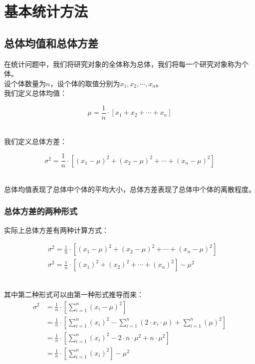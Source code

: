 \documentclass[UTF8]{ctexart}
\begin{document}
\newpage

\section{基本统计方法}

\subsection{总体均值和总体方差}
    在统计问题中，我们将研究对象的全体称为总体，我们将每一个研究对象称为个体。\\[3mm]
    设个体数量为$n$，设个体的取值分别为$x_1,x_2,\cdots,x_n$。\\[3mm]
    我们定义总体均值：
    \begin{large}
        \begin{equation*}
            \mu=\frac{1}{n}\cdot\left[x_1+x_2+\cdots+x_n\right]
        \end{equation*}
    \end{large}\\
    我们定义总体方差：
    \begin{large}
        \begin{equation*}
            \sigma^2=\frac{1}{n}\cdot\left[(x_1-\mu)^2+(x_2-\mu)^2+\cdots+(x_n-\mu)^2\right]
        \end{equation*}
    \end{large}\\
    总体均值表现了总体中个体的平均大小，总体方差表现了总体中个体的离散程度。\\

\subsubsection{总体方差的两种形式}
    实际上总体方差有两种计算方式：
    \begin{large}
        \begin{align*}
            &\sigma^2=\frac{1}{n}\cdot\left[(x_1-\mu)^2+(x_2-\mu)^2+\cdots+(x_n-\mu)^2\right]\\[3mm]
            &\sigma^2=\frac{1}{n}\cdot\left[(x_1)^2+(x_2)^2+\cdots+(x_n)^2\right]-\mu^2
        \end{align*}
    \end{large}\\
    其中第二种形式可以由第一种形式推导而来：\vspace{3pt}
    \setcounter{equation}{0}
    \begin{align}
        \sigma^2
        &=\frac{1}{n}\cdot\left[\sum_{i=1}^n(x_i-\mu)^2\right]\\[3mm]
        &=\frac{1}{n}\cdot\left[\sum_{i=1}^n(x_i)^2-\sum_{i=1}^n(2\cdot x_i\cdot \mu)+\sum_{i=1}^n(\mu)^2\right]\\[3mm]
        &=\frac{1}{n}\cdot\left[\sum_{i=1}^n(x_i)^2-2\cdot n\cdot\mu^2+n\cdot\mu^2\right]\\[3mm]
        &=\frac{1}{n}\cdot\left[\sum_{i=1}^n(x_i)^2\right]-\mu^2
    \end{align}
\end{document}
